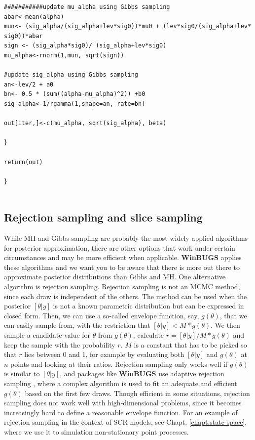 {\begin{verbatim}
###########update mu_alpha using Gibbs sampling
abar<-mean(alpha)
mun<- (sig_alpha/(sig_alpha+lev*sig0))*mu0 + (lev*sig0/(sig_alpha+lev* sig0))*abar 
sign <- (sig_alpha*sig0)/ (sig_alpha+lev*sig0)
mu_alpha<-rnorm(1,mun, sqrt(sign))

#update sig_alpha using Gibbs sampling
an<-lev/2 + a0
bn<- 0.5 * (sum((alpha-mu_alpha)^2)) +b0
sig_alpha<-1/rgamma(1,shape=an, rate=bn)

out[iter,]<-c(mu_alpha, sqrt(sig_alpha), beta)

}

return(out)

}


\end{verbatim}
}

\subsection{Rejection sampling and slice sampling }

While MH and Gibbs sampling are probably the most widely applied
algorithms for posterior approximation, there are other options that
work under certain circumstances and may be more efficient when
applicable. {\bf WinBUGS} applies these algorithms and we want you to be
aware that there is more out there to approximate posterior
distributions than Gibbs and MH.  One alternative algorithm is
rejection sampling. Rejection sampling is not an MCMC method, since
each draw is independent of the others. The method can be used when
the posterior $[\theta|y]$ is not a known parametric distribution but
can be expressed in closed form. Then, we can use a so-called envelope
function, say, $g(\theta)$, that we can easily sample from, with the
restriction that $[\theta|y] < M * g(\theta)$. We then sample a
candidate value for $\theta$ from $g(\theta)$, calculate $r =
[\theta|y]/M*g(\theta)$ and keep the sample with the probability
$r$. $M$ is a constant that has to be picked so that $r$ lies between
0 and 1, for example by evaluating both $[\theta|y]$ and $g(\theta)$
at $n$ points and looking at their ratios. Rejection sampling only
works well if $g(\theta)$ is similar to $[\theta|y]$, and packages
like {\bf WinBUGS} use adaptive rejection sampling \citep{gilks_wild:1992},
where a complex algorithm is used to fit an adequate and efficient
$g(\theta)$ based on the first few draws. 
Though efficient in some
situations, rejection sampling does not work well with
high-dimensional problems, since it becomes increasingly hard to
define a reasonable envelope function. For an example of rejection
sampling in the context of SCR models, see
Chapt. \ref{chapt.state-space}, where we use it to simulation
non-stationary point processes.  

